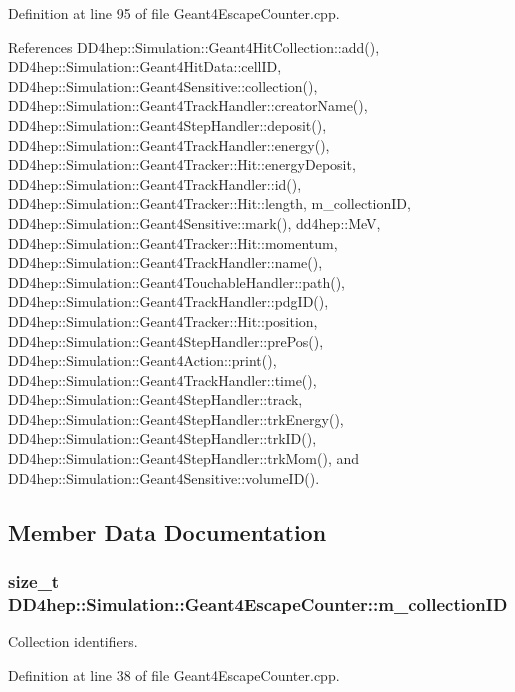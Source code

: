 Definition at line 95 of file Geant4EscapeCounter.cpp.

References DD4hep::Simulation::Geant4HitCollection::add(), DD4hep::Simulation::Geant4HitData::cellID, DD4hep::Simulation::Geant4Sensitive::collection(), DD4hep::Simulation::Geant4TrackHandler::creatorName(), DD4hep::Simulation::Geant4StepHandler::deposit(), DD4hep::Simulation::Geant4TrackHandler::energy(), DD4hep::Simulation::Geant4Tracker::Hit::energyDeposit, DD4hep::Simulation::Geant4TrackHandler::id(), DD4hep::Simulation::Geant4Tracker::Hit::length, m\_\-collectionID, DD4hep::Simulation::Geant4Sensitive::mark(), dd4hep::MeV, DD4hep::Simulation::Geant4Tracker::Hit::momentum, DD4hep::Simulation::Geant4TrackHandler::name(), DD4hep::Simulation::Geant4TouchableHandler::path(), DD4hep::Simulation::Geant4TrackHandler::pdgID(), DD4hep::Simulation::Geant4Tracker::Hit::position, DD4hep::Simulation::Geant4StepHandler::prePos(), DD4hep::Simulation::Geant4Action::print(), DD4hep::Simulation::Geant4TrackHandler::time(), DD4hep::Simulation::Geant4StepHandler::track, DD4hep::Simulation::Geant4StepHandler::trkEnergy(), DD4hep::Simulation::Geant4StepHandler::trkID(), DD4hep::Simulation::Geant4StepHandler::trkMom(), and DD4hep::Simulation::Geant4Sensitive::volumeID().

\subsection{Member Data Documentation}
\hypertarget{class_d_d4hep_1_1_simulation_1_1_geant4_escape_counter_a4705f9b7bb31e8f42d05186889ec9729}{
\subsubsection[{m\_\-collectionID}]{\setlength{\rightskip}{0pt plus 5cm}size\_\-t {\bf DD4hep::Simulation::Geant4EscapeCounter::m\_\-collectionID}}}
\label{class_d_d4hep_1_1_simulation_1_1_geant4_escape_counter_a4705f9b7bb31e8f42d05186889ec9729}


Collection identifiers. 

Definition at line 38 of file Geant4EscapeCounter.cpp.


